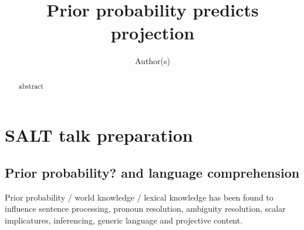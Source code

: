 \documentclass[11pt,fleqn]{article}
\title{Prior probability predicts projection}
\author{Author(s)}
\newcommand{\6}{\mbox{$[\hspace*{-.6mm}[$}}
\newcommand{\9}{\mbox{$]\hspace*{-.6mm}]$}}
\begin{document}

\maketitle

\vspace*{-1cm}

\begin{abstract}

abstract

\end{abstract}

\section{SALT talk preparation}

\subsection{Prior probability? and language comprehension}

Prior probability / world knowledge / lexical knowledge has been found to influence sentence processing, pronoun resolution, ambiguity resolution, scalar implicatures, inferencing, generic language and projective content.
\end{document}
